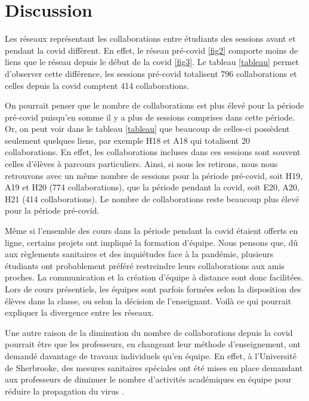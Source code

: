 \documentclass[12pt]{article}
\begin{document}
\section*{\large Discussion\vspace{-0.1cm}}
Les réseaux représentant les collaborations entre étudiants des sessions avant et pendant la covid diffèrent. En effet, le réseau pré-covid \ref{fig2} comporte moins de liens que le réseau depuis le début de la covid \ref{fig3}. Le tableau \ref{tableau} permet d’observer cette différence, les sessions pré-covid totalisent 796 collaborations et celles depuis la covid comptent 414 collaborations. 
\par On pourrait penser que le nombre de collaborations est plus élevé pour la période pré-covid puisqu’en somme il y a plus de sessions comprises dans cette période. Or, on peut voir dans le tableau \ref{tableau} que beaucoup de celles-ci possèdent seulement quelques liens, par exemple H18 et A18 qui totalisent 20 collaborations. En effet, les collaborations incluses dans ces sessions sont souvent celles d’élèves à parcours particuliers. Ainsi, si nous les retirons, nous nous retrouvons avec un même nombre de sessions pour la période pré-covid, soit H19, A19 et H20 (774 collaborations), que la période pendant la covid, soit E20, A20, H21 (414 collaborations). Le nombre de collaborations reste beaucoup plus élevé pour la période pré-covid.
\par Même si l'ensemble des cours dans la période pendant la covid étaient offerts en ligne, certains projets ont impliqué la formation d’équipe. Nous pensons que, dû aux règlements sanitaires et des inquiétudes face à la pandémie, plusieurs étudiants ont probablement préféré restreindre leurs collaborations aux amis proches. La communication et la création d’équipe à distance sont donc facilitées. Lors de cours présentiels, les équipes sont parfois formées selon la disposition des élèves dans la classe, ou selon la décision de l’enseignant. Voilà ce qui pourrait expliquer la divergence entre les réseaux. 
\par Une autre raison de la diminution du nombre de collaborations depuis la covid pourrait être que les professeurs, en changeant leur méthode d’enseignement, ont demandé davantage de travaux individuels qu’en équipe. En effet, à l’Université de Sherbrooke, des mesures sanitaires spéciales ont été mises en place demandant aux professeurs de diminuer le nombre d’activités académiques en équipe pour réduire la propagation du virus \citep{UniversiteShebrooke2021}. 
\end{document}
